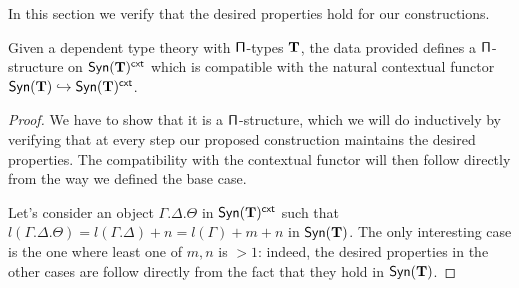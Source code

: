 In this section we verify that the desired properties hold for our
constructions.

\begin{lem}\label{extpistruct}
  Given a dependent type theory with $\operatorname{\mathsf{\Pi}}$-types $\operatorname{\mathbf{T}}$, the data provided
  defines a $\operatorname{\mathsf{\Pi}}$-structure on $\mathsf{Syn}(\mathbf{T})^{\operatorname{\mathsf{cxt}}}$ which is
  compatible with the natural contextual functor
  $\mathsf{Syn}(\mathbf{T})\hookrightarrow\mathsf{Syn}(\mathbf{T})^{\operatorname{\mathsf{cxt}}}$.
\end{lem}
\begin{proof}
  We have to
  show that it is a $\operatorname{\mathsf{\Pi}}$-structure, which we will do inductively by verifying
  that at every step our proposed construction maintains the desired properties.
  The compatibility with the contextual functor will then follow directly from
  the way we defined the base case.

  Let's consider an object $\Gamma.\Delta.\Theta$ in $\mathsf{Syn}(\mathbf{T})^{\operatorname{\mathsf{cxt}}}$ such that
  $l(\Gamma.\Delta.\Theta)=l(\Gamma.\Delta)+n=l(\Gamma)+m+n$ in $\mathsf{Syn}(\mathbf{T})$. The
  only interesting case is the one where least one of $m,n$ is
  $>1$: indeed, the desired properties in the other cases are
  follow directly from the fact that they hold in $\mathsf{Syn}(\mathbf{T})$.


\end{proof}

